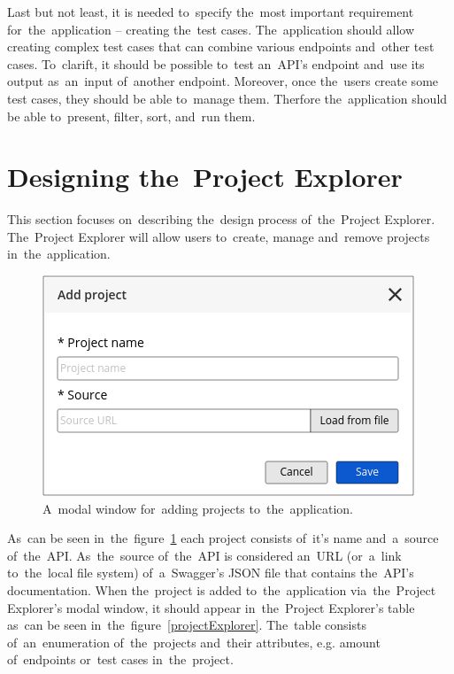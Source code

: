 Last but not least, it is needed to~specify the~most
important requirement for~the~application -- creating the~test cases.
The~application should allow creating complex test cases that can combine various 
endpoints and~other test cases. To~clarift, it should be possible
to~test an~API's endpoint and~use its output as~an~input of~another endpoint.
Moreover, once the~users create some test cases, they should be able to~manage
them. Therfore the~application should be able to~present, filter, sort, and~run
them.

\section{Designing the~Project Explorer}
This section focuses on~describing the~design process of~the~Project Explorer.
The~Project Explorer will allow users to~create, manage and~remove projects
in~the~application.

\begin{figure}[!hbt]
	\centering
	\includegraphics[scale=0.4]{./designs/drafts-1.0/add-project.png}
	\caption{A~modal window for~adding projects to~the~application.}
	\label{addProject}
\end{figure}

As~can be seen in~the~figure~\ref{addProject} each project consists of~it's name
and~a~source of~the~API. As~the~source of~the~API is considered an~URL
(or~a~link to~the~local file system) of~a~Swagger's JSON file that contains
the~API's documentation. When the~project is added to~the~application
via~the~Project Explorer's modal window, it should appear in~the~Project
Explorer's table as~can be seen in~the~figure~\ref{projectExplorer}. The~table
consists of~an~enumeration of~the~projects and~their attributes, e.g. amount
of~endpoints or~test cases in~the~project.


